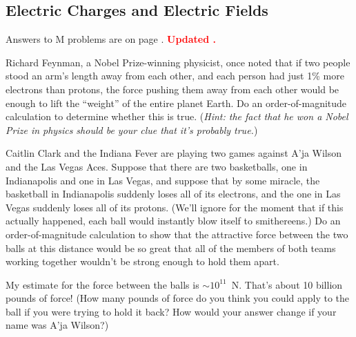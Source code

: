 \subsection{Electric Charges and Electric Fields} 


Answers to M problems are on page \pageref{charges_prob_answers}.  \textbf{\textcolor{red}{Updated \DTMnow.}}

\begin{Exercise}
Richard Feynman, a Nobel Prize-winning physicist, once noted that if two people stood an arm's length away from each other, and each person had just 1\% more electrons than protons, the force pushing them away from each other would be enough to lift the ``weight'' of the entire planet Earth.  
Do an order-of-magnitude calculation to determine whether this is true.  
(\textit{Hint: the fact that he won a Nobel Prize in physics should be your clue that it's probably true.}) 
\end{Exercise}

\begin{Exercise}
Caitlin Clark and the Indiana Fever are playing two games against A'ja Wilson and the Las Vegas Aces.  
Suppose that there are two basketballs, one in Indianapolis and one in Las Vegas,  
and suppose that by some miracle, the basketball in Indianapolis suddenly loses all of its electrons, and the one in Las Vegas suddenly loses all of its protons.  
(We'll ignore for the moment that if this actually happened, each ball would instantly blow itself to smithereens.)  
Do an order-of-magnitude calculation to show that the attractive force between the two balls at this distance would be so great that all of the members of both teams working together wouldn't be strong enough to hold them apart.
\end{Exercise}
\begin{Answer}
My estimate for the force between the balls is $\sim 10^{11}$~N.  That's about 10 billion pounds of force!  
(How many pounds of force do you think you could apply to the ball if you were trying to hold it back?  
How would your answer change if your name was A'ja Wilson?) 
\end{Answer}

